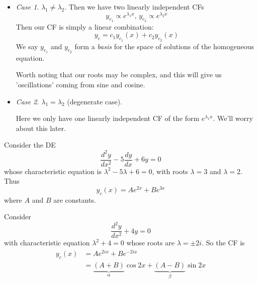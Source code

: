 \documentclass{../../template/note}
\begin{document}
    \begin{itemize}
        \item \emph{Case 1}. \(\lambda_1 \neq \lambda_2\). Then we have two linearly independent CFs
        \[
            y_{c_1} \propto e^{\lambda_1 x}, \, y_{c_2} \propto e^{\lambda_2 x}
        \]
        Then our CF is simply a linear combination:
        \[
            y_c = c_1 y_{c_1}(x) + c_2 y_{c_2} (x)
        \]
        We say \(y_{c_1}\) and \(y_{c_2}\) form a \emph{basis} for the space of solutions of the homogeneous equation.

        Worth noting that our roots may be complex, and this will give us 'oscillations' coming from sine and cosine.

        \item \emph{Case 2.} \(\lambda_1 = \lambda_2\) (degenerate case).
        
        Here we only have one linearly independent CF of the form \(e^{\lambda_1 x}\). We'll worry about this later.
    \end{itemize}
    
    \begin{example}
        Consider the DE
        \[
            \frac{d^2y}{dx^2} - 5\frac{dy}{dx} + 6y = 0
        \]    
        whose characteristic equation is \(\lambda^2 - 5\lambda + 6 = 0\), with roots \(\lambda = 3\) and \(\lambda = 2\). Thus
        \[
            y_c(x) = Ae^{2x} + Be^{3x}
        \]    
        where \(A\) and \(B\) are constants.
    \end{example}
    
    \begin{example}
        Consider
        \[
            \frac{d^2y}{dx^2} + 4y = 0
        \]
        with characteristic equation \(\lambda^2 + 4 = 0\) whose roots are \(\lambda = \pm 2i\). So the CF is
        \begin{align*}
            y_c(x) &= Ae^{2ix} + Be^{-2ix} \\
            &= \underbrace{(A+B)}_\alpha \cos 2x + \underbrace{(A-B)}_\beta \sin 2x
        \end{align*}
    \end{example}
\end{document}
